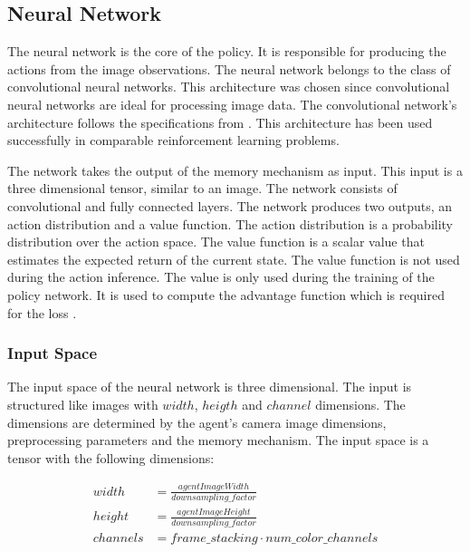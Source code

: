 \subsection{Neural Network}

The neural network is the core of the policy. It is responsible for producing the actions from the image observations. The neural network belongs to the class of convolutional neural networks. This architecture was chosen since convolutional neural networks are ideal for processing image data. The convolutional network's architecture follows the specifications from \autocite{human_level_control}. This architecture has been used successfully in comparable reinforcement learning problems.

The network takes the output of the memory mechanism as input. This input is a three dimensional tensor, similar to an image. The network consists of convolutional and fully connected layers. The network produces two outputs, an action distribution and a value function. The action distribution is a probability distribution over the action space.
The value function is a scalar value that estimates the expected return of the current state. The value function is not used during the action inference. The value is only used during the training of the policy network. It is used to compute the advantage function which is required for the loss \autocite{ppo}.




\subsubsection{Input Space}

The input space of the neural network is three dimensional. The input is structured like images with $width$, $heigth$ and $channel$ dimensions. The dimensions are determined by the agent's camera image dimensions, preprocessing parameters and the memory mechanism. The input space is a tensor with the following dimensions:

\begin{align*}
    width    & = \frac{agentImageWidth}{downsampling\_factor}  \\
    height   & = \frac{agentImageHeight}{downsampling\_factor} \\
    channels & = frame\_stacking \cdot num\_color\_channels
\end{align*}

